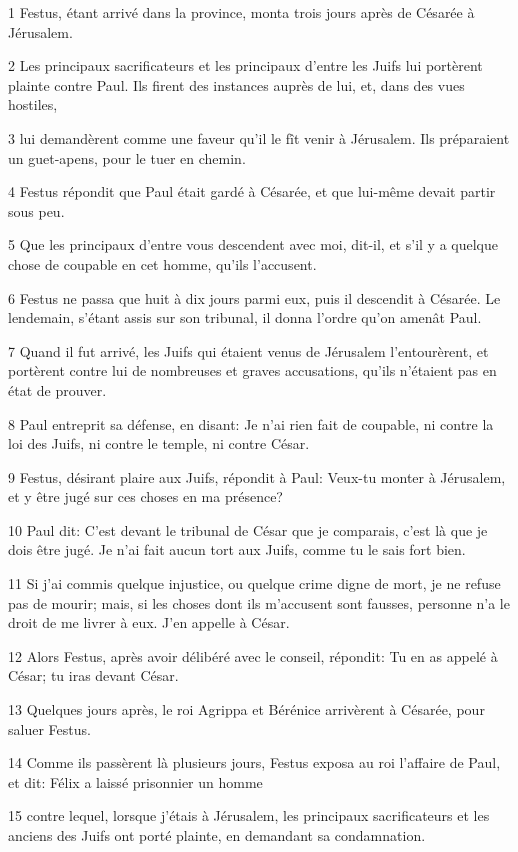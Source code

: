 \par 1 Festus, étant arrivé dans la province, monta trois jours après de Césarée à Jérusalem.
\par 2 Les principaux sacrificateurs et les principaux d'entre les Juifs lui portèrent plainte contre Paul. Ils firent des instances auprès de lui, et, dans des vues hostiles,
\par 3 lui demandèrent comme une faveur qu'il le fît venir à Jérusalem. Ils préparaient un guet-apens, pour le tuer en chemin.
\par 4 Festus répondit que Paul était gardé à Césarée, et que lui-même devait partir sous peu.
\par 5 Que les principaux d'entre vous descendent avec moi, dit-il, et s'il y a quelque chose de coupable en cet homme, qu'ils l'accusent.
\par 6 Festus ne passa que huit à dix jours parmi eux, puis il descendit à Césarée. Le lendemain, s'étant assis sur son tribunal, il donna l'ordre qu'on amenât Paul.
\par 7 Quand il fut arrivé, les Juifs qui étaient venus de Jérusalem l'entourèrent, et portèrent contre lui de nombreuses et graves accusations, qu'ils n'étaient pas en état de prouver.
\par 8 Paul entreprit sa défense, en disant: Je n'ai rien fait de coupable, ni contre la loi des Juifs, ni contre le temple, ni contre César.
\par 9 Festus, désirant plaire aux Juifs, répondit à Paul: Veux-tu monter à Jérusalem, et y être jugé sur ces choses en ma présence?
\par 10 Paul dit: C'est devant le tribunal de César que je comparais, c'est là que je dois être jugé. Je n'ai fait aucun tort aux Juifs, comme tu le sais fort bien.
\par 11 Si j'ai commis quelque injustice, ou quelque crime digne de mort, je ne refuse pas de mourir; mais, si les choses dont ils m'accusent sont fausses, personne n'a le droit de me livrer à eux. J'en appelle à César.
\par 12 Alors Festus, après avoir délibéré avec le conseil, répondit: Tu en as appelé à César; tu iras devant César.
\par 13 Quelques jours après, le roi Agrippa et Bérénice arrivèrent à Césarée, pour saluer Festus.
\par 14 Comme ils passèrent là plusieurs jours, Festus exposa au roi l'affaire de Paul, et dit: Félix a laissé prisonnier un homme
\par 15 contre lequel, lorsque j'étais à Jérusalem, les principaux sacrificateurs et les anciens des Juifs ont porté plainte, en demandant sa condamnation.
